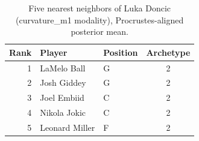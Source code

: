 \begin{table}[htbp]
  \centering\small
  \begin{tabular}{rllc}
    \toprule
    Rank & Player & Position & Archetype \\
    \midrule
    1 & LaMelo Ball & G & 2 \\
    2 & Josh Giddey & G & 2 \\
    3 & Joel Embiid & C & 2 \\
    4 & Nikola Jokic & C & 2 \\
    5 & Leonard Miller & F & 2 \\
    \bottomrule
  \end{tabular}
  \caption{Five nearest neighbors of Luka Doncic (curvature_m1 modality), Procrustes-aligned posterior mean.}
  \label{tab:Luka_Doncic_neighbors_curvature_m1}
\end{table}


